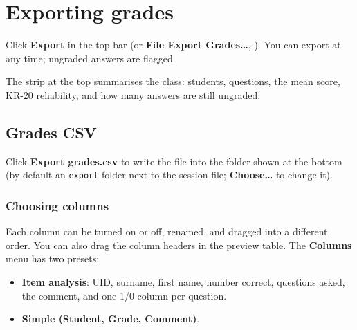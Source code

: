 \section{Exporting grades}\label{sec:export}
\tocoff

\label{sec:export:exporting-grades}

Click \textbf{Export} in the top bar (or \textbf{File \menuarrow{} Export Grades\ldots{}}, \keycap{\cmdsym{}}\keyplus{}). You can export at any time; ungraded answers are flagged.


The strip at the top summarises the class: students, questions, the mean score, KR-20 reliability, and how many answers are still ungraded.

\subsection{Grades CSV}\label{sec:export:grades-csv}

Click \textbf{Export grades.csv} to write the file into the folder shown at the bottom (by default an \texttt{export} folder next to the session file; \textbf{Choose\ldots{}} to change it).

\subsubsection{Choosing columns}\label{sec:export:choosing-columns}

Each column can be turned on or off, renamed, and dragged into a different order. You can also drag the column headers in the preview table. The \textbf{Columns} menu has two presets:

\begin{itemize}[topsep=2pt, itemsep=2pt]
\item \textbf{Item analysis}: UID, surname, first name, number correct, questions asked, the comment, and one 1/0 column per question.
\item \textbf{Simple (Student, Grade, Comment)}.
\end{itemize}

